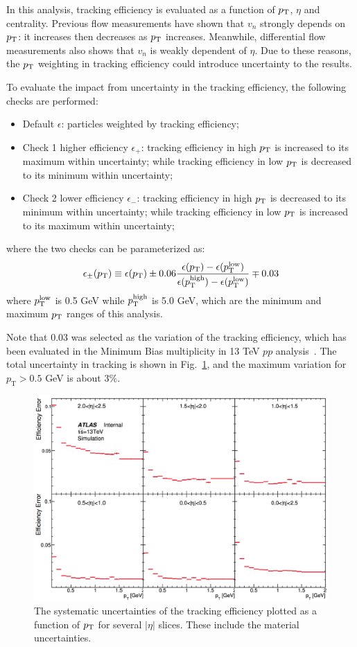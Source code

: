 In this analysis, tracking efficiency is evaluated as a function of $p_\text{T}$, $\eta$ and centrality. Previous flow measurements have shown that $v_n$ strongly depends on $p_\text{T}$: it increases then decreases as $p_\text{T}$ increases. Meanwhile, differential flow measurements also shows that $v_n$ is weakly dependent of $\eta$. Due to these reasons, the $p_\text{T}$ weighting in tracking efficiency could introduce uncertainty to the results.

To evaluate the impact from uncertainty in the tracking efficiency, the following checks are performed:
\begin{itemize}
\item Default $\epsilon$: particles weighted by tracking efficiency;
\item Check 1 higher efficiency $\epsilon_+$: tracking efficiency in high $p_\text{T}$ is increased to its maximum within uncertainty; while tracking efficiency in low $p_\text{T}$ is decreased to its minimum within uncertainty;
\item Check 2 lower efficiency $\epsilon_-$: tracking efficiency in high $p_\text{T}$ is decreased to its minimum within uncertainty; while tracking efficiency in low $p_\text{T}$ is increased to its maximum within uncertainty;
\end{itemize}
where the two checks can be parameterized as:
\begin{equation}
\epsilon_\pm(p_\text{T}) \equiv \epsilon(p_\text{T}) \pm 0.06\frac{\epsilon(p_\text{T})-\epsilon(p_\text{T}^\text{low})}{\epsilon(p_\text{T}^\text{high})-\epsilon(p_\text{T}^\text{low})} \mp 0.03
\end{equation}
where $p_\text{T}^\text{low}$ is 0.5 GeV while $p_\text{T}^\text{high}$ is 5.0 GeV, which are the minimum and maximum $p_\text{T}$ ranges of this analysis.

Note that $0.03$ was selected as the variation of the tracking efficiency, which has been evaluated in the Minimum Bias multiplicity in 13 TeV $pp$ analysis~\cite{Morley:2011604}. The total uncertainty in tracking is shown in Fig.~\ref{fig:appendix_trkEff_err}, and the maximum variation for $p_\text{T}>0.5$ GeV is about $3\%$.
\begin{figure}[H]
\centering
\includegraphics[width=.9\linewidth]{figs/chapter_appendix/trkEff_err.png}
\caption{The systematic uncertainties of the tracking efficiency plotted as a function of $p_\text{T}$ for several $|\eta|$ slices. These include the material uncertainties.}
\label{fig:appendix_trkEff_err}
\end{figure}

